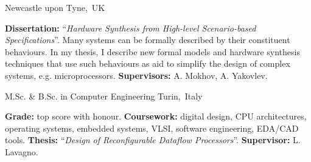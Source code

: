 
\begin{cventries}
\vspace{-5mm}

\cventry
{} %
{} %
{\vspace{-9mm}Newcastle upon Tyne,~UK} %
{} %
{ %
\begin{cvitems}
\textbf{Dissertation:} ``\textit{Hardware Synthesis from High-level 
Scenario-based Specifications}''. Many systems can be formally described 
by their constituent behaviours. In my thesis, I describe new formal models and 
hardware synthesis techniques that use such behaviours as aid to 
simplify the design of complex systems, e.g. microprocessors.
\textbf{Supervisors:} A. Mokhov, A. Yakovlev.
\end{cvitems}
}
\vspace{-4mm}

\cventry
{}
{\vspace{-9mm}M.Sc. \& B.Sc. in Computer Engineering }
{\vspace{-9mm}Turin,~Italy}
{}
{
\begin{cvitems}
\textbf{Grade:} top score with honour. \textbf{Coursework:} 
digital design, CPU architectures, operating systems, embedded systems, VLSI,
software engineering, EDA/CAD tools. \textbf{Thesis:} 
``\emph{Design 
of Reconfigurable Dataflow Processors}''. \textbf{Supervisor:} L. Lavagno.
\end{cvitems}
}


\end{cventries}
\vspace{-2mm}
